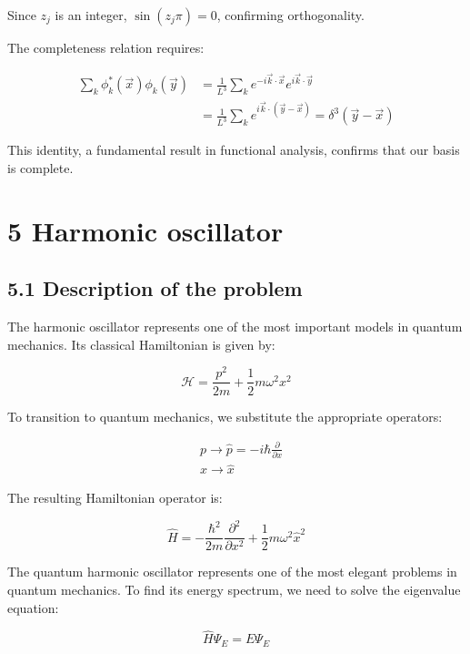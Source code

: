 \documentclass[10pt]{article}
\begin{document}
Since $z_j$ is an integer, $\sin(z_j\pi) = 0$, confirming orthogonality.

The completeness relation requires:

\begin{align*}
\sum_k \phi_k^*(\vec{x})\phi_k(\vec{y}) &= \frac{1}{L^3}\sum_k e^{-i\vec{k}\cdot\vec{x}}e^{i\vec{k}\cdot\vec{y}} \\
&= \frac{1}{L^3}\sum_k e^{i\vec{k}\cdot(\vec{y}-\vec{x})} = \delta^3(\vec{y}-\vec{x}) \tag{4.41}
\end{align*}

This identity, a fundamental result in functional analysis, confirms that our basis is complete.

\section*{5 Harmonic oscillator}
\subsection*{5.1 Description of the problem}

The harmonic oscillator represents one of the most important models in quantum mechanics. Its classical Hamiltonian is given by:

\begin{equation*}
\mathcal{H} = \frac{p^2}{2m} + \frac{1}{2}m\omega^2 x^2 \tag{5.1}
\end{equation*}

To transition to quantum mechanics, we substitute the appropriate operators:

\begin{align*}
&p \longrightarrow \hat{p} = -i\hbar\frac{\partial}{\partial x} \tag{5.2} \\
&x \longrightarrow \hat{x}
\end{align*}

The resulting Hamiltonian operator is:


\begin{equation*}
\hat{H} = -\frac{\hbar^2}{2m}\frac{\partial^2}{\partial x^2} + \frac{1}{2}m\omega^2\hat{x}^2 \tag{5.3}
\end{equation*}

The quantum harmonic oscillator represents one of the most elegant problems in quantum mechanics. To find its energy spectrum, we need to solve the eigenvalue equation:

\begin{equation*}
\hat{H}\Psi_E = E\Psi_E \tag{5.4}
\end{equation*}
\end{document}
